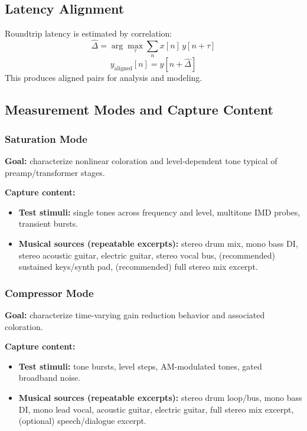 \documentclass[11pt, letterpaper]{article}
\begin{document}
\subsection{Latency Alignment}

Roundtrip latency is estimated by correlation:
\begin{equation}
    \hat{\Delta} = \arg\max_\tau \sum_n x[n]\, y[n + \tau]
\end{equation}
\begin{equation}
    y_\text{aligned}[n] = y[n + \hat{\Delta}]
\end{equation}
This produces aligned pairs for analysis and modeling.

\subsection{Measurement Modes and Capture Content}

\subsubsection*{Saturation Mode}

\textbf{Goal:} characterize nonlinear coloration and level-dependent tone typical of preamp/transformer stages.

\textbf{Capture content:}
\begin{itemize}[leftmargin=1.5em]
    \item \textbf{Test stimuli:} single tones across frequency and level, multitone IMD probes, transient bursts.
    \item \textbf{Musical sources (repeatable excerpts):}
          stereo drum mix, mono bass DI, stereo acoustic guitar, electric guitar, stereo vocal bus,
          (recommended) sustained keys/synth pad, (recommended) full stereo mix excerpt.
\end{itemize}

\subsubsection*{Compressor Mode}

\textbf{Goal:} characterize time-varying gain reduction behavior and associated coloration.

\textbf{Capture content:}
\begin{itemize}[leftmargin=1.5em]
    \item \textbf{Test stimuli:} tone bursts, level steps, AM-modulated tones, gated broadband noise.
    \item \textbf{Musical sources (repeatable excerpts):}
          stereo drum loop/bus, mono bass DI, mono lead vocal, acoustic guitar, electric guitar,
          full stereo mix excerpt, (optional) speech/dialogue excerpt.
\end{itemize}
\end{document}
